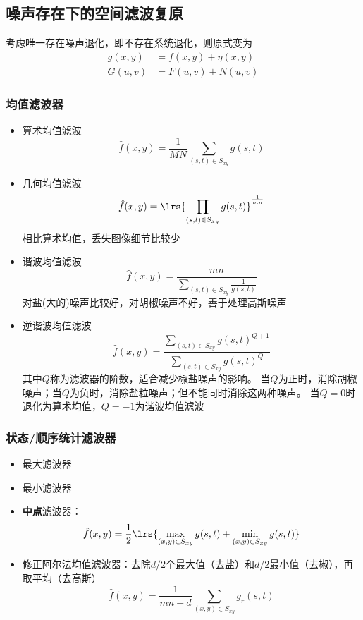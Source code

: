 \subsection{噪声存在下的空间滤波复原}
考虑唯一存在噪声退化，即不存在系统退化，则原式变为
\[\begin{aligned}
g(x,y)&=f(x,y)+\eta(x,y)\\
G(u,v)&=F(u,v)+N(u,v)
\end{aligned}\]

\subsubsection{均值滤波器}
\begin{itemize}
	\item 算术均值滤波
	\[\hat{f}(x,y)=\frac{1}{MN}\sum_{(s,t)\in S_{xy}}g(s,t)\]
	\item 几何均值滤波
	\[\hat{f}(x,y)=\lrs{\prod_{(s,t)\in S_{xy}}g(s,t)}^{\frac{1}{mn}}\]
	相比算术均值，丢失图像细节比较少
	\item 谐波均值滤波
	\[\hat{f}(x,y)=\frac{mn}{\sum_{(s,t)\in S_{xy}}\frac{1}{g(s,t)}}\]
	对盐(大的)噪声比较好，对胡椒噪声不好，善于处理高斯噪声
	\item 逆谐波均值滤波
	\[\hat{f}(x,y)=\frac{\sum_{(s,t)\in S_{xy}}g(s,t)^{Q+1}}{\sum_{(s,t)\in S_{xy}}g(s,t)^Q}\]
	其中$Q$称为滤波器的阶数，适合减少椒盐噪声的影响。
	当$Q$为正时，消除胡椒噪声；当$Q$为负时，消除盐粒噪声；但不能同时消除这两种噪声。
	当$Q=0$时退化为算术均值，$Q=-1$为谐波均值滤波
\end{itemize}

\subsubsection{状态/顺序统计滤波器}
\begin{itemize}
	\item 最大滤波器
	\item 最小滤波器
	\item \textbf{中点}滤波器：
	\[\hat{f}(x,y)=\frac{1}{2}\lrs{\max_{(x,y)\in S_{xy}}g(s,t)+\min_{(x,y)\in S_{xy}}g(s,t)}\]
	\item 修正阿尔法均值滤波器：去除$d/2$个最大值（去盐）和$d/2$最小值（去椒），再取平均（去高斯）
	\[\hat{f}(x,y)=\frac{1}{mn-d}\sum_{(x,y)\in S_{xy}}g_r(s,t)\]
\end{itemize}

